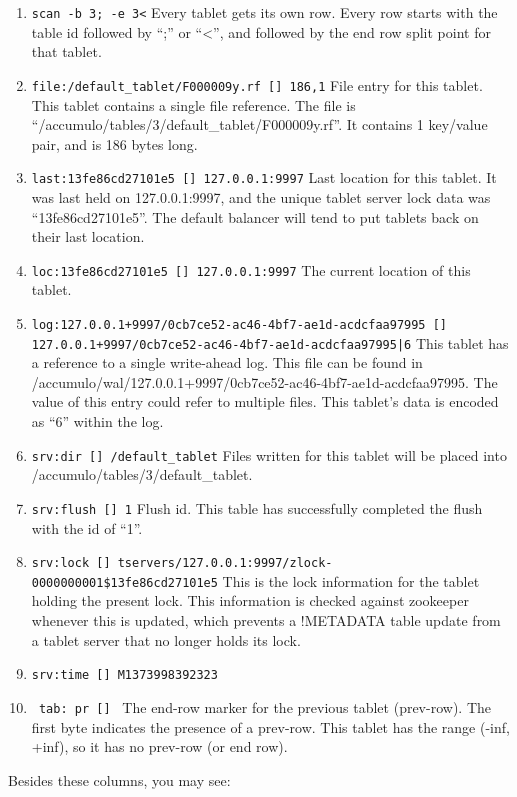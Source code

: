 \begin{enumerate}
\item{\texttt{scan -b 3; -e 3<} Every tablet gets its own row. Every row starts with the table id followed by ``;'' or ``<'', and followed by the end row split point for that tablet.}
\item{\texttt{file:/default\_tablet/F000009y.rf [] 186,1} File entry for this tablet.  This tablet contains a single file reference. The file is ``/accumulo/tables/3/default\_tablet/F000009y.rf''.  It contains 1 key/value pair, and is 186 bytes long. }
\item{\texttt{last:13fe86cd27101e5 []    127.0.0.1:9997} Last location for this tablet.  It was last held on 127.0.0.1:9997, and the unique tablet server lock data was ``13fe86cd27101e5''. The default balancer will tend to put tablets back on their last location. }
\item{\texttt{loc:13fe86cd27101e5 []    127.0.0.1:9997} The current location of this tablet.}
\item{\texttt{log:127.0.0.1+9997/0cb7ce52-ac46-4bf7-ae1d-acdcfaa97995 []    127.0.0.1+9997/0cb7ce52-ac46-4bf7-ae1d-acdcfaa97995|6} This tablet has a reference to a single write-ahead log.  This file can be found in /accumulo/wal/127.0.0.1+9997/0cb7ce52-ac46-4bf7-ae1d-acdcfaa97995.  The value of this entry could refer to multiple files.  This tablet's data is encoded as ``6'' within the log.}
\item{\texttt{srv:dir []    /default\_tablet} Files written for this tablet will be placed into /accumulo/tables/3/default\_tablet.}
\item{\texttt{srv:flush []    1} Flush id.  This table has successfully completed the flush with the id of ``1''. }
\item{\texttt{srv:lock []    tservers/127.0.0.1:9997/zlock-0000000001\$13fe86cd27101e5}  This is the lock information for the tablet holding the present lock.  This information is checked against zookeeper whenever this is updated, which prevents a !METADATA table update from a tablet server that no longer holds its lock.}
\item{\texttt{srv:time []    M1373998392323} }
\item{\texttt{~tab:~pr []    } The end-row marker for the previous tablet (prev-row).  The first byte indicates the presence of a prev-row.  This tablet has the range (-inf, +inf), so it has no prev-row (or end row). }
\end{enumerate}

Besides these columns, you may see:

